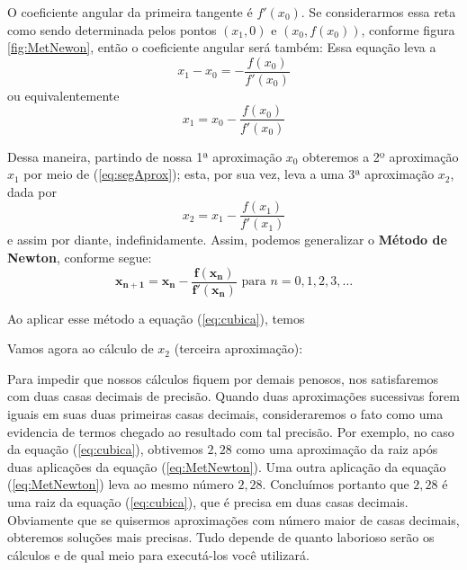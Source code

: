 \cleardoublepage\documentclass[../main.tex]{subfiles}
\begin{document}
O coeficiente angular da primeira tangente é $f'(x_0)$. Se considerarmos essa reta como sendo determinada pelos pontos $(x_1, 0)$ e $(x_0,f(x_0))$, conforme figura \ref{fig:MetNewon}, então o coeficiente angular será também: 
Essa equação leva a
\begin{equation*}
     x_1-x_0=-\frac{f(x_0)}{f'(x_0)}
\end{equation*}
ou equivalentemente
\begin{equation}
   x_1=x_0-\frac{f(x_0)}{f'(x_0)}
    \label{eq:segAprox}
\end{equation}

Dessa maneira, partindo de nossa 1ª aproximação $x_0$ obteremos a 2º aproximação $x_1$ por meio 
de (\ref{eq:segAprox}); esta, por sua vez, leva a uma 3ª aproximação $x_2$, dada por 
\begin{equation}
   x_2=x_1-\frac{f(x_1)}{f'(x_1)}
    \label{eq:tercAprox}
\end{equation}
e assim por diante, indefinidamente. Assim, podemos generalizar o \textbf{Método de Newton}, conforme segue:
\begin{equation}
 \boldsymbol{ x_{n+1}=x_{n}-\frac{f(x_n)}{f'(x_n)}} \textrm{ para } n=0,1,2,3, \ldots \label{eq:MetNewton}
\end{equation}

Ao aplicar esse método a equação (\ref{eq:cubica}), temos 

Vamos agora ao cálculo de $x_2$ (terceira aproximação):

Para impedir que nossos cálculos fiquem por demais penosos, nos satisfaremos com duas casas decimais de precisão. Quando duas aproximações sucessivas forem iguais em suas duas  primeiras casas decimais, consideraremos o fato como uma evidencia de termos chegado ao resultado com tal precisão. Por exemplo, no caso da equação (\ref{eq:cubica}), obtivemos $2,28$ como uma 
aproximação da raiz após duas aplicações da equação (\ref{eq:MetNewton}). Uma outra aplicação  da equação (\ref{eq:MetNewton}) leva ao 
mesmo número $2,28$. Concluímos portanto que $2,2$8 é uma raiz da equação (\ref{eq:cubica}), que é precisa em duas casas decimais. Obviamente que se quisermos aproximações com número maior de casas decimais, obteremos soluções mais precisas. Tudo depende de quanto laborioso serão os cálculos e de qual meio para executá-los você utilizará.
\end{document}
